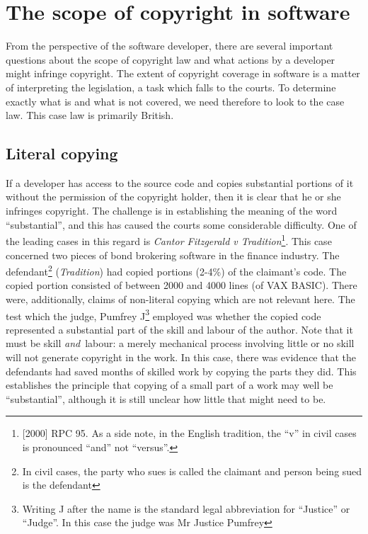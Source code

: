 \documentclass[a4paper,12pt]{article}
\begin{document}
\section{The scope of copyright in software}

From the perspective of the software developer, there are several important
questions about the scope of copyright law and what actions by a developer
might infringe copyright. The extent of copyright coverage in software is a
matter of interpreting the legislation, a task which falls to the courts. To
determine exactly what is and what is not covered, we need therefore to look
to the case law. This case law is primarily British.

\subsection{Literal copying}

If a developer has access to the source code and copies substantial portions
of it without the permission of the copyright holder, then it is clear that
he or she infringes copyright. The challenge is in establishing the meaning
of the word ``substantial'', and this has caused the courts some
considerable difficulty. One of the leading cases in this regard is
\textit{Cantor Fitzgerald v Tradition}\footnote{[2000] RPC 95. As a side note, in
  the English tradition, the ``v'' in civil cases is pronounced ``and'' not ``versus''.}. This case
concerned two pieces of bond brokering software in the finance industry. The
defendant\footnote{In civil cases, the party who sues is called the claimant
  and person being sued is the defendant} (\textit{Tradition}) had copied portions (2-4\%) of the
claimant's code. The copied portion consisted of between 2000 and 4000 lines
(of VAX BASIC). There were, additionally, claims of non-literal copying
which are not relevant here. The test which the judge, Pumfrey
J\footnote{Writing J after the name is the standard legal abbreviation for
  ``Justice'' or ``Judge''. In this case the judge was Mr Justice Pumfrey}
employed was whether the copied code represented a substantial part of the
skill and labour of the author. Note that it must be skill \emph{and}\
labour: a merely mechanical process involving little or no skill will not
generate copyright in the work. In this case, there was evidence that the defendants had
saved months of skilled work by copying the parts they did. This establishes
the principle that copying of a small part of a work may well be
``substantial'', although it is still unclear how little that might need to be.
\end{document}
